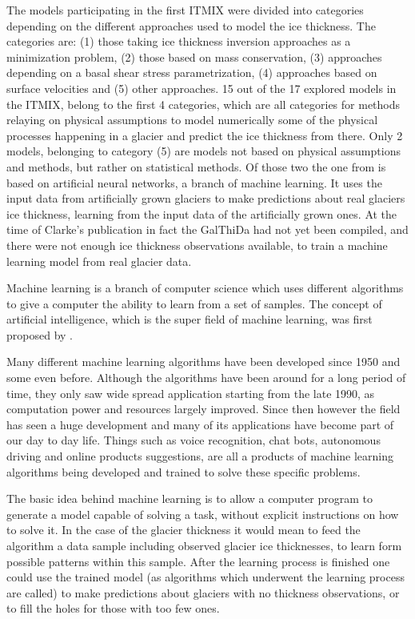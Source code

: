 The models participating in the first ITMIX were divided into categories depending on the different approaches used to model the ice thickness. The categories are: (1) those taking ice thickness inversion approaches as a minimization problem, (2) those based on mass conservation,  (3) approaches depending on a basal shear stress parametrization, (4) approaches based on surface velocities and (5) other approaches. 15 out of the 17 explored models in the ITMIX, belong to the first 4 categories, which are all categories for methods relaying on physical assumptions to model numerically some of the physical processes happening in a glacier and predict the ice thickness from there. Only 2 models, belonging to category (5) are models not based on physical assumptions and methods, but rather on statistical methods. Of those two the one from \citet{Clarke2009} is based on artificial neural networks, a branch of machine learning. It uses the input data from artificially grown glaciers to make predictions about real glaciers ice thickness, learning from the input data of the artificially grown ones. At the time of Clarke's publication in fact the GalThiDa had not yet been compiled, and there were not enough ice thickness observations available, to train a machine learning model from real glacier data.

Machine learning is a branch of computer science which uses different algorithms to give a computer the ability to learn from a set of samples. The concept of artificial intelligence, which is the super field of machine learning, was first proposed by \citet{Turing1950}.

Many different machine learning algorithms have been developed since 1950 and some even before. Although the algorithms have been around for a long period of time, they only saw wide spread application starting from the late 1990, as computation power and resources largely improved. Since then however the field has seen a huge development and many of its applications have become part of our day to day life. Things such as voice recognition, chat bots, autonomous driving and online products suggestions, are all a products of machine learning algorithms being developed and trained to solve these specific problems.

The basic idea behind machine learning is to allow a computer program to generate a model capable of solving a task, without explicit instructions on how to solve it. In the case of the glacier thickness it would mean to feed the algorithm a data sample including observed glacier ice thicknesses, to learn form possible patterns within this sample. After the learning process is finished one could use the trained model (as algorithms which underwent the learning process are called) to make predictions about glaciers with no thickness observations, or to fill the holes for those with too few ones.

